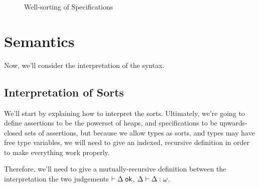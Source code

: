 \begin{figure}
\caption{Well-sorting of Specifications}
\label{logic-spec-ok}
\end{figure}

\section{Semantics}

Now, we'll consider the interpretation of the syntax. 

\subsection{Interpretation of Sorts}

We'll start by explaining how to interpret the sorts. Ultimately,
we're going to define assertions to be the powerset of heaps, and
specifications to be upwards-closed sets of assertions, but because we
allow types as sorts, and types may have free type variables, we will
need to give an indexed, recursive definition in order to make
everything work properly.

Therefore, we'll need to give a mutually-recursive definition between
the interpretation the two judgements $\vdash {\Delta} \;\mbox{\textsf{{ok}}}$,
${\Delta} \vdash {\Delta} : {\omega}$.

